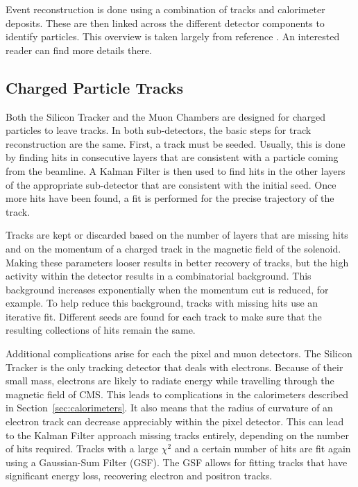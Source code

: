 Event reconstruction is done using a combination of tracks and calorimeter deposits.
These are then linked across the different detector components to identify particles.
This overview is taken largely from reference \cite{Sirunyan_2017}.
An interested reader can find more details there.

\subsection{Charged Particle Tracks} \label{sec:tracks}

Both the Silicon Tracker and the Muon Chambers are designed
for charged particles to leave tracks.
In both sub-detectors, the basic steps for track reconstruction are the same.
First, a track must be seeded.
Usually, this is done by finding hits in consecutive layers that are consistent
with a particle coming from the beamline.
A Kalman Filter is then used to find hits in the other layers of the appropriate sub-detector
that are consistent with the initial seed.
Once more hits have been found, a fit is performed for the precise trajectory of the track.

Tracks are kept or discarded based on the number of layers that are missing hits
and on the momentum of a charged track in the magnetic field of the solenoid.
Making these parameters looser results in better recovery of tracks,
but the high activity within the detector results in a combinatorial background.
This background increases exponentially when the momentum cut is reduced, for example.
To help reduce this background, tracks with missing hits use an iterative fit.
Different seeds are found for each track to make sure that the resulting collections
of hits remain the same.

Additional complications arise for each the pixel and muon detectors.
The Silicon Tracker is the only tracking detector that deals with electrons.
Because of their small mass, electrons are likely to radiate energy
while travelling through the magnetic field of CMS.
This leads to complications in the calorimeters described in Section~\ref{sec:calorimeters}.
It also means that the radius of curvature of an electron track can decrease appreciably
within the pixel detector.
This can lead to the Kalman Filter approach missing tracks entirely,
depending on the number of hits required.
Tracks with a large $\chi^2$ and a certain number of hits are fit again
using a Gaussian-Sum Filter (GSF).
The GSF allows for fitting tracks that have significant energy loss,
recovering electron and positron tracks.

